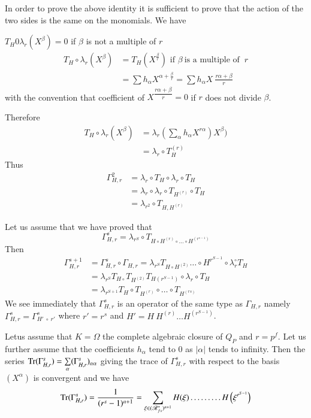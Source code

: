 In order to prove the above identity it is sufficient to prove that
the action of the two sides is the same on the monomials. We have  

$T_H 0 \lambda_r (X^\beta) = 0$ if $\beta$ is not a multiple of $r$
\begin{align*}
  T_H \circ \lambda_r (X^\beta) &= T_H (X^{\frac{\beta}{r}}) \text{ if }
  \beta ~\text{is a multiple of }~r\\ 
  &= \sum h_\alpha X^{\alpha + \frac{\beta}{r}} = \sum h_{\alpha}X ~
  \frac{r \alpha + \beta}{r} 
\end{align*}\pageoriginale
with the convention that coefficient of $X^{\dfrac{r \alpha +
    \beta}{r}} = 0$ if $r$ does not divide $\beta$. 

Therefore 
\begin{align*}
  T_H \circ \lambda _r (X^\beta ) &= \lambda _r \left(\sum_\alpha h_\alpha X^{
    r \alpha}\right) X^\beta )\\ 
  &= \lambda _r \circ T_H^{(r)}
\end{align*}
Thus
\begin{align*}
  \Gamma ^2_{H,r} &= \lambda _r \circ T_H \circ \lambda _r \circ T_H \\
  &= \lambda _r  \circ \lambda _r  \circ T_{H^{(r)}} \circ T_H \\
  &= \lambda _{r^2} \circ T_{H, H^{(r)}}
\end{align*} 

Let us assume that we have proved that 
$$
\Gamma^{s}_{H,r} = \lambda _{r^S} \circ  T_{H \circ H^{(r)} \circ
  \ldots \circ H^{(r^{s-1})}} 
$$
Then
\begin{align*}
  \Gamma ^{s+1}_{H,r} &= \Gamma^{s}_{H,r} \circ \Gamma _{H,r} =
  \lambda_{r^S} T_{H \circ H^{(2)}} \dots \circ H^{r^{S-1}} \circ \lambda _r^\circ
  T_H\\ 
  &=  \lambda _{r^S} T_{H \circ} T_{H^{(2)}} T_{H (r^{S-1})} \circ
  \lambda _r \circ T_H\\ 
  &= \lambda_{r^{S+1}} T_H \circ T_{H^{(r)}} \circ \dots \circ T_{H^{(rs)}}
\end{align*} 
We see immediately that $\Gamma^s_{H,r}$ is an operator of the same
type as $\Gamma_{H,r}$ namely $\Gamma^s _{H,r} = \Gamma^s _{H' ~ \circ ~
  r'}$ where $r' = r^s$ and $H' = H ~ H^{(r)}\dots H^{(r^{S-1})} $. 

\begin{Lemma}\label{part3:chap2:sec9:lem3}%
  Let\pageoriginale us assume that $K = \Omega$ the complete algebraic closure of
  $Q_P $ and $r= p^f$. Let us further assume that the coefficients
  $h_\alpha$  tend  to $0$ as $|\alpha |$ tends to infinity. Then the
  series $\operatorname{Tr} (\Gamma^s_{H,r}) = \sum \limits_{\alpha} (\Gamma^s_{H,r})
    _{\alpha \alpha}$ giving the trace of $\Gamma^s _{H,r}$ with
  respect to the basis $(X^\alpha)$  is convergent and we have 
  $$
  \operatorname{Tr} (\Gamma^s_{H,r}) = \frac{1}{(r^{s} - 1)^{n+1}} = \sum_{\xi \in
    (\mathscr{R}^*_{fs})^{n+1}} H(\xi) \dots \dots \dots
  H \left(\xi^{r^{S-1}}\right) 
  $$
\end{Lemma} 

